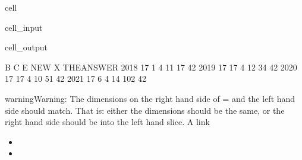 \documentclass[letterpaper,10pt,english]{jupyterBook}
\begin{document}
\begin{sphinxuseclass}{cell}\begin{sphinxVerbatimInput}

\begin{sphinxuseclass}{cell_input}
\begin{sphinxVerbatim}[commandchars=\\\{\}]
\PYG{p}{[}\PYG{p}{]}  
\end{sphinxVerbatim}

\end{sphinxuseclass}\end{sphinxVerbatimInput}
\begin{sphinxVerbatimOutput}

\begin{sphinxuseclass}{cell_output}
\begin{sphinxVerbatim}[commandchars=\\\{\}]
       B   C  E  NEW    X  THE\PYGZus{}ANSWER
2018  17   1  4   11   17          42
2019  17  17  4   12   34          42
2020  17  17  4   10   51          42
2021  17   6  4   14  102          42
\end{sphinxVerbatim}

\end{sphinxuseclass}\end{sphinxVerbatimOutput}

\end{sphinxuseclass}
\begin{sphinxadmonition}{warning}{Warning:}
\sphinxAtStartPar
The dimensions on the right hand side of = and the left hand side should match. That is: either the dimensions should be the same, or the right hand side should be  into the left hand slice.
A link 
\end{sphinxadmonition}

\sphinxAtStartPar
{}
\begin{itemize}
\item {} 
\sphinxAtStartPar
{}

\item {} 
\sphinxAtStartPar
{}

\end{itemize}
\end{document}
